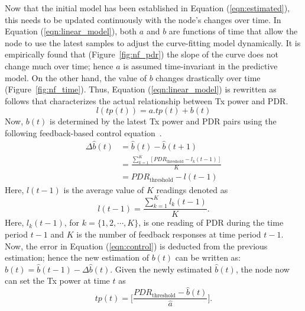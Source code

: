 Now that the initial model has been established in Equation (\ref{eqn:estimated}), this needs to be updated continuously with the node's changes over time. In Equation (\ref{eqn:linear_model}), both $a$ and $b$ are functions of time that allow the node to use the latest samples to adjust the curve-fitting model dynamically. 
It is empirically found that (Figure~\ref{fig:nf_pdr}) the slope of the curve does not change much over time; hence $a$ is assumed time-invariant in the predictive model. On the other hand, the value of $b$ changes drastically over time (Figure~\ref{fig:nf_time}). Thus, Equation (\ref{eqn:linear_model}) is rewritten as follows that characterizes the actual relationship between Tx power and PDR.
\begin{equation}
	\nonumber l(tp(t)) = a.tp(t) + b(t)
\end{equation}
Now, $b(t)$ is determined by the latest Tx power and PDR pairs using the following feedback-based control equation~\cite{lin2016atpc}.
\begin{align}
	\nonumber \Delta \hat{b}(t) &= \hat{b}(t) - \hat{b}(t+1) \\
    			\nonumber	  &= \frac{\sum^K_{k=1} [PDR_{\text{threshold}} - l_k(t - 1)]}{K} \\ 
                      &= PDR_{\text{threshold}} - l(t-1) \label{eqn:control}
\end{align}
Here, $l(t-1)$ is the average value of $K$ readings denoted as 
\begin{equation}
	\nonumber l(t-1) = \frac{\sum^K_{k=1} l_k(t - 1)}{K}.
\end{equation}
Here, $l_k(t-1)$, for $k = \{1, 2, \cdots, K\}$, is one reading of PDR during the time period $t-1$ and $K$ is the number of feedback responses at time period $t-1$. Now, the error in Equation (\ref{eqn:control}) is deducted from the previous estimation; hence the new estimation of $b(t)$ can be written as: $\hat{b}(t) = \hat{b}(t-1) - \Delta \hat{b}(t)$.
Given the newly estimated $\hat{b}(t)$, the node now can set the Tx power at time $t$ as
\begin{equation}
	\nonumber tp(t) = \big[\frac{PDR_{\text{threshold}} - \hat{b}(t)}{\hat{a}}\big].
\end{equation}













